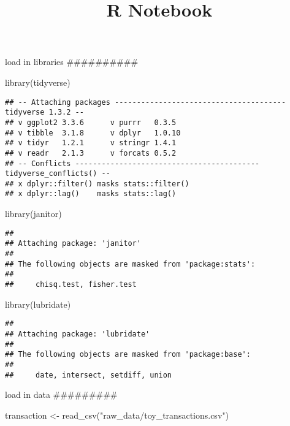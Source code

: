 \documentclass[
]{article}
\title{R Notebook}
\author{}
\date{\vspace{-2.5em}}
\newenvironment{Shaded}{\begin{snugshade}}{\end{snugshade}}
\newcommand{\FunctionTok}[1]{\textcolor[rgb]{0.00,0.00,0.00}{#1}}
\newcommand{\NormalTok}[1]{#1}
\newcommand{\OtherTok}[1]{\textcolor[rgb]{0.56,0.35,0.01}{#1}}
\newcommand{\StringTok}[1]{\textcolor[rgb]{0.31,0.60,0.02}{#1}}
\begin{document}
\maketitle

load in libraries \#\#\#\#\#\#\#\#\#\#

\begin{Shaded}
\begin{Highlighting}[]
\FunctionTok{library}\NormalTok{(tidyverse)}
\end{Highlighting}
\end{Shaded}

\begin{verbatim}
## -- Attaching packages --------------------------------------- tidyverse 1.3.2 --
## v ggplot2 3.3.6      v purrr   0.3.5 
## v tibble  3.1.8      v dplyr   1.0.10
## v tidyr   1.2.1      v stringr 1.4.1 
## v readr   2.1.3      v forcats 0.5.2 
## -- Conflicts ------------------------------------------ tidyverse_conflicts() --
## x dplyr::filter() masks stats::filter()
## x dplyr::lag()    masks stats::lag()
\end{verbatim}

\begin{Shaded}
\begin{Highlighting}[]
\FunctionTok{library}\NormalTok{(janitor)}
\end{Highlighting}
\end{Shaded}

\begin{verbatim}
## 
## Attaching package: 'janitor'
## 
## The following objects are masked from 'package:stats':
## 
##     chisq.test, fisher.test
\end{verbatim}

\begin{Shaded}
\begin{Highlighting}[]
\FunctionTok{library}\NormalTok{(lubridate)}
\end{Highlighting}
\end{Shaded}

\begin{verbatim}
## 
## Attaching package: 'lubridate'
## 
## The following objects are masked from 'package:base':
## 
##     date, intersect, setdiff, union
\end{verbatim}

load in data \#\#\#\#\#\#\#\#\#

\begin{Shaded}
\begin{Highlighting}[]
\NormalTok{transaction }\OtherTok{\textless{}{-}} \FunctionTok{read\_csv}\NormalTok{(}\StringTok{"raw\_data/toy\_transactions.csv"}\NormalTok{) }
\end{Highlighting}
\end{Shaded}
\end{document}
